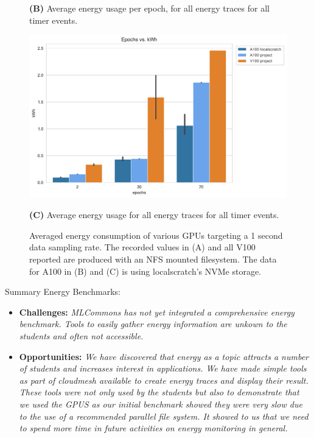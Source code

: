 \documentclass[utf8]{FrontiersinVancouver} %
\begin{document}
\begin{figure}[htb]
{\begin{center}
         {\bf (B)} Average energy usage per epoch, for all energy traces for all timer events.

        \includegraphics[height=0.28\textheight]{images/total_epoch_vs_watts_new}

        {\bf (C)} Average energy usage for all energy traces for all timer events.


  \end{center}
  }
  
  \caption{Averaged energy consumption of various GPUs targeting a 1 second data sampling rate. The recorded values in (A) and all V100 reported are produced with an NFS mounted filesystem.  The data for A100 in (B) and (C) is using localscratch's NVMe storage.} 
  \label{fig:energy-graphs-compare}
\end{figure}


\begin{tcolorbox}
Summary Energy Benchmarks:

\begin{itemize}
\item {\bf Challenges:} {\it MLCommons has not yet integrated a comprehensive energy benchmark. Tools to easily gather energy information are unkown to the students and often not accessible.}
\item {\bf Opportunities:} {\it We have discovered that energy as a topic attracts a number of students and increases interest in applications. We have made simple tools as part of cloudmesh available to create energy traces and display their result. These tools were not only used by the students but also to demonstrate that we used the GPUS as our initial benchmark showed they were very slow due to the use of a recommended parallel file system. It showed to us that we need to spend more time in future activities on energy monitoring in general.}
\end{itemize}
\end{tcolorbox}
\end{document}
